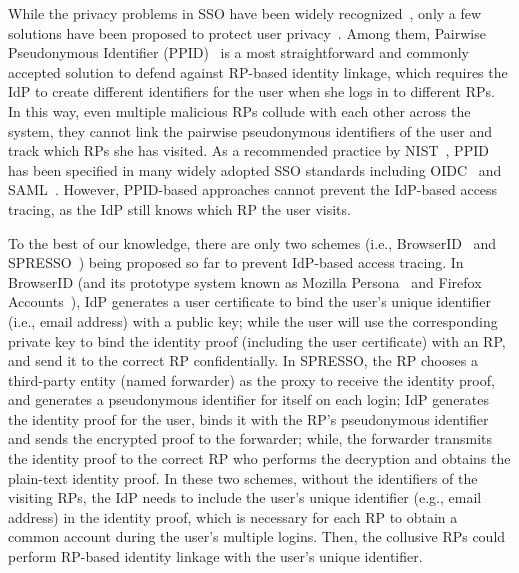 While the privacy problems in SSO have been widely recognized~\cite{maler2008venn,NIST2017draft}, only a few solutions have been proposed to protect user privacy~\cite{persona,SPRESSO}. Among them, Pairwise Pseudonymous Identifier (PPID)~\cite{OpenIDConnect, SAMLIdentifier} is a most straightforward and commonly accepted solution to defend against RP-based identity linkage, which requires the IdP to create different identifiers for the user when she logs in to different RPs. In this way, even multiple malicious RPs collude with each other across the system, they cannot link the  pairwise pseudonymous identifiers of the user and track which RPs she has visited. As a recommended practice by NIST~\cite{NIST2017draft}, PPID has been specified in many widely adopted SSO standards including OIDC~\cite{OpenIDConnect} and SAML~\cite{SAMLIdentifier}.
However, PPID-based approaches cannot prevent the IdP-based access tracing, as the IdP still knows which RP the user visits.

To the best of our knowledge, there are only two schemes (i.e., BrowserID~\cite{BrowserID} and SPRESSO~\cite{SPRESSO}) being proposed so far to prevent IdP-based access tracing.
In BrowserID (and its prototype system known as Mozilla Persona~\cite{persona} and Firefox Accounts~\cite{FirefoxAccount}),
 IdP generates a user certificate to bind the user's unique identifier (i.e., email address) with a public key;
 while the user will use the corresponding private key to bind the identity proof (including the user certificate) with an RP, and send it to the correct RP confidentially.
In SPRESSO, the RP chooses a third-party entity (named forwarder) as the proxy to receive the identity proof,
 and generates a pseudonymous identifier for itself on each login;
 IdP generates the identity proof for the user,  binds it with the RP's pseudonymous identifier and sends the encrypted proof to the forwarder;
 while, the forwarder transmits the identity proof to the correct RP who performs the decryption and obtains the plain-text identity proof.
In these two schemes, without the identifiers of the visiting RPs,
the IdP needs to include the user's unique identifier (e.g., email address) in the identity proof,
 which is necessary for  each RP to  obtain a common account during the user's multiple logins.
Then, the collusive RPs could  perform RP-based identity linkage with the user's unique identifier.





